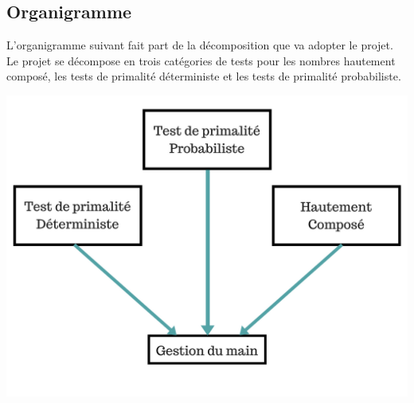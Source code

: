 		\subsection{Organigramme}
		L'organigramme suivant fait part de la décomposition que va adopter le projet. Le projet se décompose en trois catégories de tests pour les nombres hautement composé, les tests de primalité déterministe et les tests de primalité probabiliste. \\ 
		\begin{center}\includegraphics[scale=0.5]{organigramme.png}\end{center}
		
